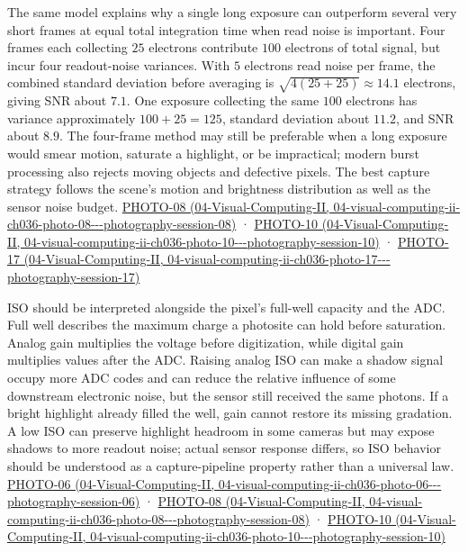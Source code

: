 The same model explains why a single long exposure can outperform several very short frames at equal total integration time when read noise is important. Four frames each collecting \(25\) electrons contribute \(100\) electrons of total signal, but incur four readout-noise variances. With \(5\) electrons read noise per frame, the combined standard deviation before averaging is \(\sqrt{4(25+25)}\approx14.1\) electrons, giving SNR about \(7.1\). One exposure collecting the same \(100\) electrons has variance approximately \(100+25=125\), standard deviation about \(11.2\), and SNR about \(8.9\). The four-frame method may still be preferable when a long exposure would smear motion, saturate a highlight, or be impractical; modern burst processing also rejects moving objects and defective pixels. The best capture strategy follows the scene's motion and brightness distribution as well as the sensor noise budget. \href{../04-Visual-Computing-II/main.pdf\#nameddest=04-visual-computing-ii-ch036-photo-08---photography-session-08}{PHOTO-08 (04-Visual-Computing-II, 04-visual-computing-ii-ch036-photo-08-\/-\/-photography-session-08)} · \href{../04-Visual-Computing-II/main.pdf\#nameddest=04-visual-computing-ii-ch036-photo-10---photography-session-10}{PHOTO-10 (04-Visual-Computing-II, 04-visual-computing-ii-ch036-photo-10-\/-\/-photography-session-10)} · \href{../04-Visual-Computing-II/main.pdf\#nameddest=04-visual-computing-ii-ch036-photo-17---photography-session-17}{PHOTO-17 (04-Visual-Computing-II, 04-visual-computing-ii-ch036-photo-17-\/-\/-photography-session-17)}

ISO should be interpreted alongside the pixel's full-well capacity and the ADC. Full well describes the maximum charge a photosite can hold before saturation. Analog gain multiplies the voltage before digitization, while digital gain multiplies values after the ADC. Raising analog ISO can make a shadow signal occupy more ADC codes and can reduce the relative influence of some downstream electronic noise, but the sensor still received the same photons. If a bright highlight already filled the well, gain cannot restore its missing gradation. A low ISO can preserve highlight headroom in some cameras but may expose shadows to more readout noise; actual sensor response differs, so ISO behavior should be understood as a capture-pipeline property rather than a universal law. \href{../04-Visual-Computing-II/main.pdf\#nameddest=04-visual-computing-ii-ch036-photo-06---photography-session-06}{PHOTO-06 (04-Visual-Computing-II, 04-visual-computing-ii-ch036-photo-06-\/-\/-photography-session-06)} · \href{../04-Visual-Computing-II/main.pdf\#nameddest=04-visual-computing-ii-ch036-photo-08---photography-session-08}{PHOTO-08 (04-Visual-Computing-II, 04-visual-computing-ii-ch036-photo-08-\/-\/-photography-session-08)} · \href{../04-Visual-Computing-II/main.pdf\#nameddest=04-visual-computing-ii-ch036-photo-10---photography-session-10}{PHOTO-10 (04-Visual-Computing-II, 04-visual-computing-ii-ch036-photo-10-\/-\/-photography-session-10)}


